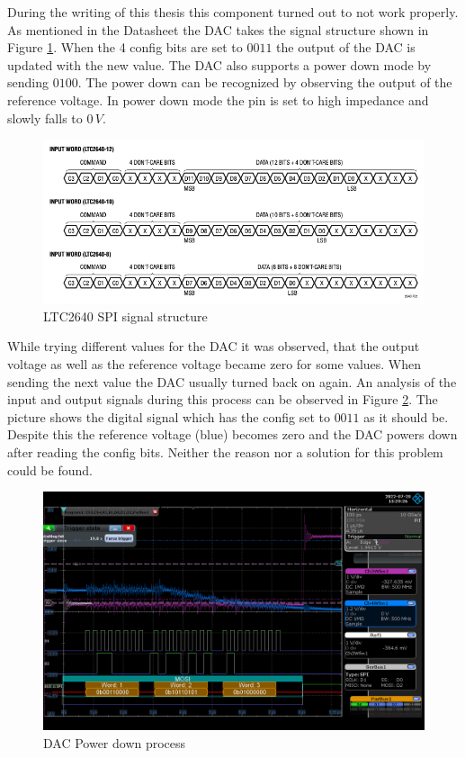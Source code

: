 During the writing of this thesis this component turned out to not work properly. As mentioned in the Datasheet the DAC takes the signal structure shown in Figure \ref{fig:meas:circ:dac_spi}. When the 4 config bits are set to $0011$ the output of the DAC is updated with the new value. The DAC also supports a power down mode by sending $0100$. The power down can be recognized by observing the output of the reference voltage. In power down mode the pin is set to high impedance and slowly falls to $0\,V$.\cite{linear_technology_ltc2640_2017}
%
\begin{figure}
  \centering
  \includegraphics[width=\textwidth]{src/assets/pictures/measurements/dac_bit_structure.png}
  \caption{LTC2640 SPI signal structure\cite{linear_technology_ltc2640_2017}}\label{fig:meas:circ:dac_spi}
\end{figure}
\p
While trying different values for the DAC it was observed, that the output voltage as well as the reference voltage became zero for some values. When sending the next value the DAC usually turned back on again. An analysis of the input and output signals during this process can be observed in Figure \ref{fig:meas:circ:dac_power_down}.\p
The picture shows the digital signal which has the config set to $0011$ as it should be. Despite this the reference voltage (blue) becomes zero and the DAC powers down after reading the config bits. Neither the reason nor a solution for this problem could be found.
%
\begin{figure}
  \centering
  \includegraphics[height=\largeheight]{src/assets/pictures/measurements/dac_power_down.png}
  \caption{DAC Power down process}\label{fig:meas:circ:dac_power_down}
\end{figure}